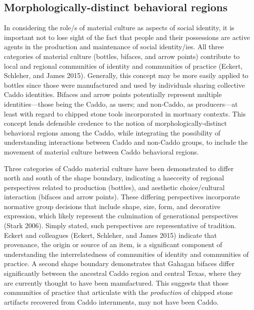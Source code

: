 \documentclass[smallextended]{svjour3}       %
\begin{document}
\hypertarget{morphologically-distinct-behavioral-regions}{%
\subsection{Morphologically-distinct behavioral
regions}\label{morphologically-distinct-behavioral-regions}}

In considering the role/s of material culture as aspects of social
identity, it is important not to lose sight of the fact that people and
their possessions are active agents in the production and maintenance of
social identity/ies. All three categories of material culture (bottles,
bifaces, and arrow points) contribute to local and regional communities
of identity and communities of practice (Eckert, Schleher, and James
2015). Generally, this concept may be more easily applied to bottles
since those were manufactured and used by individuals sharing collective
Caddo identities. Bifaces and arrow points potentially represent
multiple identities---those being the Caddo, as users; and non-Caddo, as
producers---at least with regard to chipped stone tools incorporated in
mortuary contexts. This concept lends defensible credence to the notion
of morphologically-distinct behavioral regions among the Caddo, while
integrating the possibility of understanding interactions between Caddo
and non-Caddo groups, to include the movement of material culture
between Caddo behavioral regions.

Three categories of Caddo material culture have been demonstrated to
differ north and south of the shape boundary, indicating a haecceity of
regional perspectives related to production (bottles), and aesthetic
choice/cultural interaction (bifaces and arrow points). These differing
perspectives incorporate normative group decisions that include shape,
size, form, and decorative expression, which likely represent the
culmination of generational perspectives (Stark 2006). Simply stated,
such perspectives are representative of tradition. Eckert and colleagues
(Eckert, Schleher, and James 2015) indicate that provenance, the origin
or source of an item, is a significant component of understanding the
interrelatedness of communities of identity and communities of practice.
A second shape boundary demonstrates that Gahagan bifaces differ
significantly between the ancestral Caddo region and central Texas,
where they are currently thought to have been manufactured. This
suggests that those communities of practice that articulate with the
\emph{production} of chipped stone artifacts recovered from Caddo
internments, may not have been Caddo.
\end{document}
